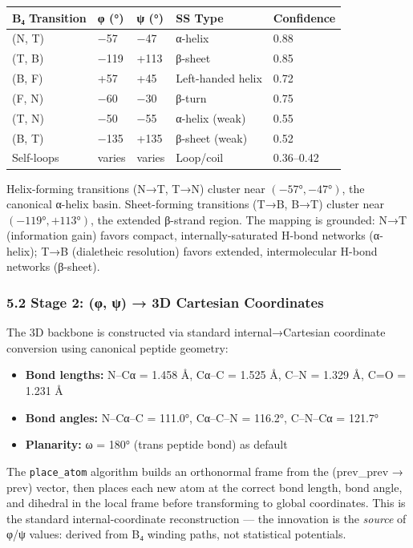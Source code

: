 \begin{longtable}[]{@{}lllll@{}}
\toprule
B₄ Transition & φ (°) & ψ (°) & SS Type & Confidence\tabularnewline
\midrule
\endhead
(N, T) & −57 & −47 & α-helix & 0.88\tabularnewline
(T, B) & −119 & +113 & β-sheet & 0.85\tabularnewline
(B, F) & +57 & +45 & Left-handed helix & 0.72\tabularnewline
(F, N) & −60 & −30 & β-turn & 0.75\tabularnewline
(T, N) & −50 & −55 & α-helix (weak) & 0.55\tabularnewline
(B, T) & −135 & +135 & β-sheet (weak) & 0.52\tabularnewline
Self-loops & varies & varies & Loop/coil & 0.36--0.42\tabularnewline
\bottomrule
\end{longtable}

Helix-forming transitions (N→T, T→N) cluster near \((-57°, -47°)\), the
canonical α-helix basin. Sheet-forming transitions (T→B, B→T) cluster
near \((-119°, +113°)\), the extended β-strand region. The mapping is
grounded: N→T (information gain) favors compact, internally-saturated
H-bond networks (α-helix); T→B (dialetheic resolution) favors extended,
intermolecular H-bond networks (β-sheet).

\hypertarget{stage-2-ux3c6-ux3c8-3d-cartesian-coordinates}{%
\subsubsection{5.2 Stage 2: (φ, ψ) → 3D Cartesian
Coordinates}\label{stage-2-ux3c6-ux3c8-3d-cartesian-coordinates}}

The 3D backbone is constructed via standard internal→Cartesian
coordinate conversion using canonical peptide geometry:

\begin{itemize}
\tightlist
\item
  \textbf{Bond lengths:} N--Cα = 1.458 Å, Cα--C = 1.525 Å, C--N = 1.329
  Å, C=O = 1.231 Å
\item
  \textbf{Bond angles:} N--Cα--C = 111.0°, Cα--C--N = 116.2°, C--N--Cα =
  121.7°
\item
  \textbf{Planarity:} ω = 180° (trans peptide bond) as default
\end{itemize}

The \texttt{place\_atom} algorithm builds an orthonormal frame from the
(prev\_prev → prev) vector, then places each new atom at the correct
bond length, bond angle, and dihedral in the local frame before
transforming to global coordinates. This is the standard
internal-coordinate reconstruction --- the innovation is the
\emph{source} of φ/ψ values: derived from B₄ winding paths, not
statistical potentials.

